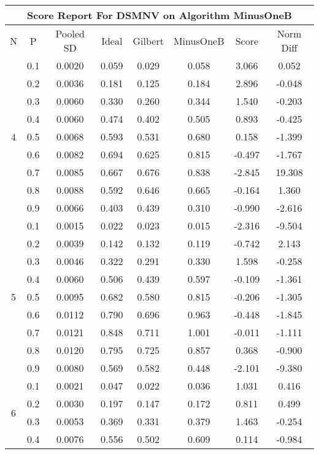 \documentclass[11pt,a4paper]{report}
\begin{document}
\begin{longtable}{ | c | c || c | c | c | c | c | c | }
\hline
\multicolumn{8}{|c|}{ Score Report For DSMNV on Algorithm MinusOneB} \\
\hline
N & P & Pooled SD &  Ideal &  Gilbert & MinusOneB  & Score & Norm Diff \\
 \hline
 \hline
 \endhead
\multirow{9}{*}{4} & 0.1 & 0.0020 & 0.059 & 0.029 & 0.058 & 3.066 & 0.052 \\
 & 0.2 & 0.0036 & 0.181 & 0.125 & 0.184 & 2.896 & -0.048 \\
 & 0.3 & 0.0060 & 0.330 & 0.260 & 0.344 & 1.540 & -0.203 \\
 & 0.4 & 0.0060 & 0.474 & 0.402 & 0.505 & 0.893 & -0.425 \\
 & 0.5 & 0.0068 & 0.593 & 0.531 & 0.680 & 0.158 & -1.399 \\
 & 0.6 & 0.0082 & 0.694 & 0.625 & 0.815 & -0.497 & -1.767 \\
 & 0.7 & 0.0085 & 0.667 & 0.676 & 0.838 & -2.845 & 19.308 \\
 & 0.8 & 0.0088 & 0.592 & 0.646 & 0.665 & -0.164 & 1.360 \\
 & 0.9 & 0.0066 & 0.403 & 0.439 & 0.310 & -0.990 & -2.616 \\
 \hline
\multirow{9}{*}{5} & 0.1 & 0.0015 & 0.022 & 0.023 & 0.015 & -2.316 & -9.504 \\
 & 0.2 & 0.0039 & 0.142 & 0.132 & 0.119 & -0.742 & 2.143 \\
 & 0.3 & 0.0046 & 0.322 & 0.291 & 0.330 & 1.598 & -0.258 \\
 & 0.4 & 0.0060 & 0.506 & 0.439 & 0.597 & -0.109 & -1.361 \\
 & 0.5 & 0.0095 & 0.682 & 0.580 & 0.815 & -0.206 & -1.305 \\
 & 0.6 & 0.0112 & 0.790 & 0.696 & 0.963 & -0.448 & -1.845 \\
 & 0.7 & 0.0121 & 0.848 & 0.711 & 1.001 & -0.011 & -1.111 \\
 & 0.8 & 0.0120 & 0.795 & 0.725 & 0.857 & 0.368 & -0.900 \\
 & 0.9 & 0.0080 & 0.569 & 0.582 & 0.448 & -2.101 & -9.380 \\
 \hline
\multirow{9}{*}{6} & 0.1 & 0.0021 & 0.047 & 0.022 & 0.036 & 1.031 & 0.416 \\
 & 0.2 & 0.0030 & 0.197 & 0.147 & 0.172 & 0.811 & 0.499 \\
 & 0.3 & 0.0053 & 0.369 & 0.331 & 0.379 & 1.463 & -0.254 \\
 & 0.4 & 0.0076 & 0.556 & 0.502 & 0.609 & 0.114 & -0.984 \\

\end{longtable}
\end{document}
